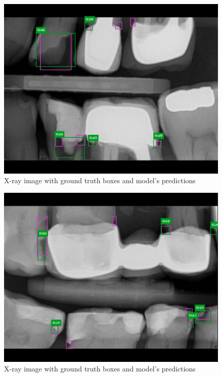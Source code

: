 \begin{figure}
    \includegraphics[width=0.9\linewidth]{images/rest1.png}
    \caption{X-ray image with ground truth boxes and model's predictions}
    \label{fig:pred_img3}
\end{figure}

\begin{figure}
    \includegraphics[width=0.9\linewidth]{images/rest2.png}
    \caption{X-ray image with ground truth boxes and model's predictions}
    \label{fig:pred_img4}
\end{figure}

